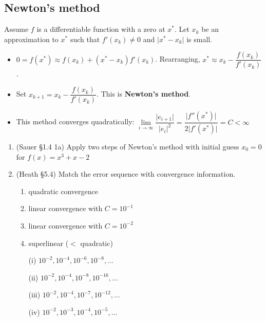 \documentclass[12pt,letterpaper,noanswers]{exam}
\begin{document}
\subsection*{Newton's method}
\begin{tcolorbox}
Assume $f$ is a differentiable function with a zero at $x^*$.  Let $x_k$ be an approximation to $x^*$ such that $f'(x_k)\neq 0$ and $\vert x^*-x_k\vert$ is small.
\begin{itemize}
\itemsep0pt
    \item $ 0 = f(x^*) \approx f(x_k) + (x^*-x_k)f'(x_k)$.  Rearranging, $x^* \approx x_k - \dfrac{f(x_k)}{f'(x_k)}$.
    \item Set $x_{k+1} = x_k - \dfrac{f(x_k)}{f'(x_k)}$.  This is \textbf{Newton's method}.
    \item This method converges quadratically: $\lim\limits_{i\rightarrow\infty} \dfrac{\vert e_{i+1}\vert }{\vert e_i\vert^2 } = \dfrac{\vert f''(x^*)\vert}{2\vert f'(x^*)\vert} = C < \infty$
\end{itemize}
\end{tcolorbox}
\begin{enumerate}[resume=classQ]
    \item (Sauer \S1.4 1a) Apply two steps of Newton's method with initial guess $x_0 = 0$ for $f(x) = x^3+x-2$
    \vspace{1in}
    
    \item (Heath \S 5.4) Match the error sequence with convergence information.
    
    \begin{enumerate}
    \item quadratic convergence
    \item linear convergence with $C = 10^{-1}$
    \item linear convergence with $C = 10^{-2}$
    \item superlinear ($<$ quadratic)
    \end{enumerate}
    
    \begin{enumerate}
    \item[(i)] $10^{-2},10^{-4},10^{-6},10^{-8},...$
    \item[(ii)] $10^{-2},10^{-4},10^{-8},10^{-16},...$
    \item[(iii)] $10^{-2},10^{-4},10^{-7},10^{-12},...$
    \item[(iv)] $10^{-2},10^{-3},10^{-4},10^{-5},...$
    \end{enumerate}
\end{enumerate}
\end{document}
